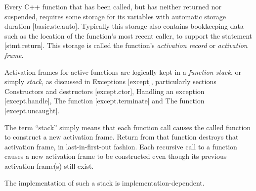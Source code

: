 
Every C++ function that has been called, but has neither returned nor
suspended, requires some storage for its variables with automatic storage
duration [basic.stc.auto]. Typically this storage also contains bookkeeping
data such as the location of the function's most recent caller, to support
the  statement [stmt.return]. This storage is called the
function's \emph{activation record} or \emph{activation frame}.

Activation frames for active functions are logically kept in a \emph{function
stack}, or simply \emph{stack}, as discussed in Exceptions [except],
particularly sections Constructors and destructors [except.ctor], Handling an
exception [except.handle], The  function
[except.terminate] and The  function
[except.uncaught].

The term ``stack'' simply means that each function call causes the called
function to construct a new activation frame. Return from that function
destroys that activation frame, in last-in-first-out fashion. Each recursive
call to a function causes a new activation frame to be constructed even though
its previous activation frame(s) still exist.

The implementation of such a stack is implementation-dependent.
